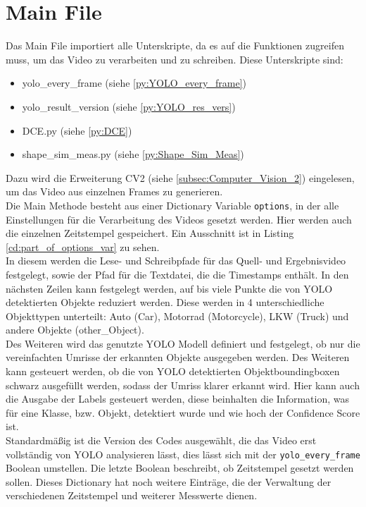 \section{Main File}
{ 
	Das Main File importiert alle Unterskripte, da es auf die Funktionen zugreifen muss, um das Video zu verarbeiten und zu schreiben. Diese Unterskripte sind: 
	\begin{itemize}
		\item yolo\_every\_frame (siehe \ref{py:YOLO_every_frame})
		\item yolo\_result\_version (siehe \ref{py:YOLO_res_vers})
		\item DCE.py (siehe \ref{py:DCE})
		\item shape\_sim\_meas.py (siehe \ref{py:Shape_Sim_Meas})
	\end{itemize}
	Dazu wird die Erweiterung CV2 (siehe \ref{subsec:Computer_Vision_2}) eingelesen, um das Video aus einzelnen Frames zu generieren.\\
	Die Main Methode besteht aus einer Dictionary Variable \lstinline|options|, in der alle Einstellungen für die Verarbeitung des Videos gesetzt werden. Hier werden auch die einzelnen Zeitstempel gespeichert. Ein Ausschnitt ist in Listing \ref{cd:part_of_options_var} zu sehen. \\
	In diesem werden die Lese- und Schreibpfade für das Quell- und Ergebnisvideo festgelegt, sowie der Pfad für die Textdatei, die die Timestamps enthält. In den nächsten Zeilen kann festgelegt werden, auf bis viele Punkte die von YOLO detektierten Objekte reduziert werden. Diese werden in 4 unterschiedliche Objekttypen unterteilt: Auto (Car), Motorrad (Motorcycle), LKW (Truck) und andere Objekte (other\_Object). \\
	Des Weiteren wird das genutzte YOLO Modell definiert und festgelegt, ob nur die vereinfachten Umrisse der erkannten Objekte ausgegeben werden. Des Weiteren kann gesteuert werden, ob die von YOLO detektierten Objektboundingboxen schwarz ausgefüllt werden, sodass der Umriss klarer erkannt wird. Hier kann auch die Ausgabe der Labels gesteuert werden, diese beinhalten die Information, was für eine Klasse, bzw. Objekt, detektiert wurde und wie hoch der Confidence Score ist. \\
	Standardmäßig ist die Version des Codes ausgewählt, die das Video erst vollständig von YOLO analysieren lässt, dies lässt sich mit der \lstinline|yolo_every_frame| Boolean umstellen. Die letzte Boolean beschreibt, ob Zeitstempel gesetzt werden sollen. Dieses Dictionary hat noch weitere Einträge, die der Verwaltung der verschiedenen Zeitstempel und weiterer Messwerte dienen. \\
}

